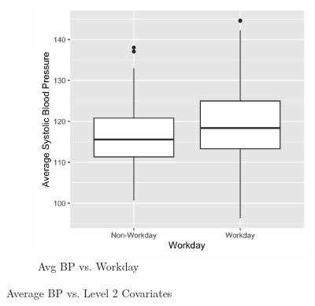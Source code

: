 \documentclass[12pt,twoside,leqno,fleqn,letterpaper]{article}
\theoremstyle{definition}
\theoremstyle{definition}
\begin{document}
\begin{figure}
\begin{subfigure}{0.48\textwidth}
        \includegraphics[width=\textwidth]{pics/bp v day.png}
        \caption{{\small Avg BP vs. Workday}}
        \label{fig: bp v day}
    \end{subfigure}
    \caption{{\small Average BP vs. Level 2 Covariates}}
    \label{fig: bp v level2}
\end{figure}
\end{document}

